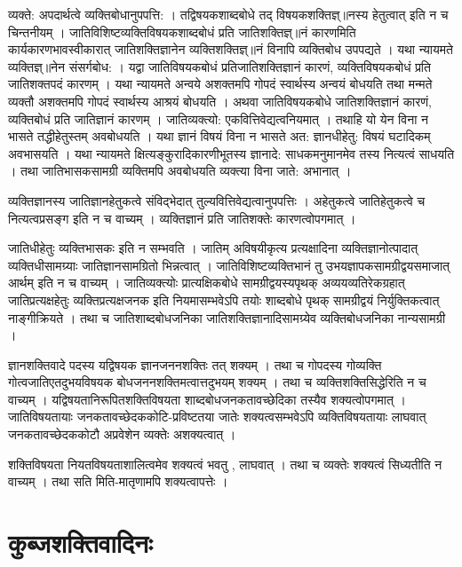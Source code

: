 व्यक्ते: अपदार्थत्वे व्यक्तिबोधानुपपत्ति: । तद्विषयकशाब्दबोधे तद् विषयकशक्तिज्ञ्॥नस्य हेतुत्वात् इति न च चिन्तनीयम् । जातिविशिष्टव्यक्तिविषयकशाब्दबोधं प्रति जातिशक्तिज्ञ्॥नं कारणमिति कार्यकारणभावस्वीकारात् जातिशक्तिज्ञानेन व्यक्तिशक्तिज्ञ्॥नं विनापि व्यक्तिबोध उपपद्यते । यथा न्यायमते व्यक्तिज्ञ्॥नेन संसर्गबोध: । यद्वा जातिविषयकबोधं प्रतिजातिशक्तिज्ञानं कारणं, व्यक्तिविषयकबोधं प्रति जातिशक्तपदं कारणम् । यथा न्यायमते अन्वये अशक्तमपि गोपदं स्वार्थस्य अन्वयं बोधयति तथा मन्मते व्यक्तौ अशक्तमपि गोपदं स्वार्थस्य आश्रयं बोधयति । अथवा जातिविषयकबोधे जातिशक्तिज्ञानं कारणं, व्यक्तिबोधं प्रति जातिज्ञानं कारणम् । जातिव्यक्त्यो: एकवित्तिवेद्यत्वनियमात् । तथाहि यो येन विना न भासते तद्धीहेतुस्तम् अवबोधयति । यथा ज्ञानं विषयं विना न भासते अत: ज्ञानधीहेतु: विषयं घटादिकम् अवभासयति । यथा न्यायमते क्षित्यङ्कुरादिकारणीभूतस्य ज्ञानादे: साधकमनुमानमेव तस्य नित्यत्वं साधयति । तथा जातिभासकसामग्री व्यक्तिमपि अवबोधयति व्यक्त्या विना जाते: अभानात् । 

व्यक्तिज्ञानस्य जातिज्ञानहेतुकत्वे संविद्भेदात् तुल्यवित्तिवेद्यत्वानुपपत्तिः । अहेतुकत्वे जातिहेतुकत्वे च नित्यत्वप्रसङ्ग इति न च वाच्यम् । व्यक्तिज्ञानं प्रति जातिशक्तेः कारणत्वोपगमात् ।

जातिधीहेतुः व्यक्तिभासकः इति न सम्भवति । जातिम् अविषयीकृत्य प्रत्यक्षादिना व्यक्तिज्ञानोत्पादात् व्यक्तिधीसामग्र्याः जातिज्ञानसामग्रितो भिन्नत्वात् । जातिविशिष्टव्यक्तिभानं तु उभयज्ञापकसामग्रीद्वयसमाजात् आर्थम्  इति न च वाच्यम् । जातिव्यक्त्योः  प्रात्यक्षिकबोधे सामग्रीद्वयस्यपृथक् अव्ययव्यतिरेकग्रहात् जातिप्रत्यक्षहेतुः व्यक्तिप्रत्यक्षजनक इति नियमासम्भवेऽपि तयोः शाब्दबोधे पृथक् सामग्रीद्वयं निर्युक्तिकत्वात् नाङ्गीक्रियते । तथा च जातिशाब्दबोधजनिका जातिशक्तिज्ञानादिसामग्र्येव व्यक्तिबोधजनिका नान्यसामग्री ।

ज्ञानशक्तिवादे पदस्य यद्विषयक ज्ञानजननशक्तिः तत् शक्यम् । तथा च गोपदस्य गोव्यक्ति गोत्वजातिएतदुभयविषयक बोधजननशक्तिमत्वात्तदुभयम् शक्यम् । तथा च व्यक्तिशक्तिसिद्धेरिति न च वाच्यम् । यद्विषयतानिरूपितशक्तिविषयता शाब्दबोधजनकतावच्छेदिका तस्यैव शक्यत्वोपगमात् । जातिविषयतायाः जनकतावच्छेदककोटि-प्रविष्टतया जातेः शक्यत्वसम्भवेऽपि व्यक्तिविषयतायाः लाघवात् जनकतावच्छेदककोटौ अप्रवेशेन व्यक्तेः अशक्यत्वात् ।

शक्तिविषयता नियतविषयताशालित्वमेव शक्यत्वं भवतु , लाघवात् । तथा च व्यक्तेः  शक्यत्वं सिध्यतीति न वाच्यम् । तथा सति मिति-मातृणामपि शक्यत्वापत्तेः ।

\section*{कुब्जशक्तिवादिनः}

